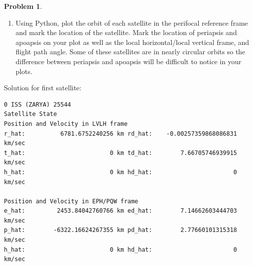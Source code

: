 \documentclass[10pt]{article}
\theoremstyle{definition}
\newtheorem{prob}{Problem}[section]
\newenvironment{subprob}%
{\renewcommand{\theenumi}{\alph{enumi}}\renewcommand{\labelenumi}{(\theenumi)}\begin{enumerate}}%
{\end{enumerate}}%
\begin{document}
\begin{prob}
\begin{subprob}
    The orbital properties of the first satellite (first row) is given below.
    You should provide your hand calculations demonstrating the computation of the orbital properties for this case. 
    This test case is used to verify your software is working correctly.
    For the other cases, you can simply provide the output of your program.
\item Using Python, plot the orbit of each satellite in the perifocal reference frame and mark the location of the satellite.
    Mark the location of periapsis and apoapsis on your plot as well as the local horizontal/local vertical frame, and flight path angle.
    Some of these satellites are in nearly circular orbits so the difference between periapsis and apoapsis will be difficult to notice in your plots.
    \end{subprob}

Solution for first satellite:

\clearpage\newpage
    \begin{verbatim}
0 ISS (ZARYA) 25544                                                                                                                                                                           
Satellite State                                                                                                                                                                               
Position and Velocity in LVLH frame                                                                                                                                                           
r_hat:          6781.6752240256 km rd_hat:    -0.00257359868086831 km/sec                                                                                      
t_hat:                        0 km td_hat:        7.66705746939915 km/sec                                                                                                                     
h_hat:                        0 km hd_hat:                       0 km/sec                                                                                                                     
                                                                                                                                                                                              
Position and Velocity in EPH/PQW frame                                                                                                                                                        
e_hat:         2453.84042760766 km ed_hat:        7.14662603444703 km/sec                                                                                                                     
p_hat:        -6322.16624267355 km pd_hat:        2.77660101315318 km/sec      
h_hat:                        0 km hd_hat:                       0 km/sec      
                                                                               

\end{verbatim}
\end{prob}
\end{document}
